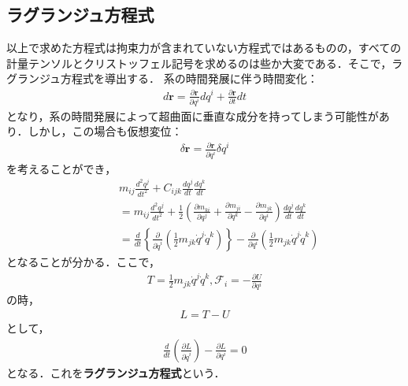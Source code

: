 \documentclass[../Main.tex]{subfiles}
\begin{document}
\subsection{ラグランジュ方程式}
以上で求めた方程式は拘束力が含まれていない方程式ではあるものの，すべての計量テンソルとクリストッフェル記号を求めるのは些か大変である．そこで，ラグランジュ方程式を導出する．
系の時間発展に伴う時間変化：
\begin{eqnarray}
  d\bm{r} = \frac{\partial \bm{r}}{\partial q^i}dq^i + \frac{\partial\bm{r}}{\partial t}dt
\end{eqnarray}
となり，系の時間発展によって超曲面に垂直な成分を持ってしまう可能性があり．しかし，この場合も仮想変位：
\begin{eqnarray}
  \delta\bm{r} = \frac{\partial \bm{r}}{\partial q^i}\delta q^i
\end{eqnarray}
を考えることができ，
\begin{eqnarray}
  &&m_{ij}\frac{d^2 q^j}{dt^2} + C_{ijk}\frac{d q^j}{dt}\frac{d q^k}{dt}\\
  \quad&&=m_{ij}\frac{d^2 q^j}{dt^2} + \frac{1}{2}\left( \frac{\partial m_{ki}}{\partial q^j}+\frac{\partial m_{ji}}{\partial q^k}-\frac{\partial m_{jk}}{\partial q^i} \right)\frac{d q^j}{dt}\frac{d q^k}{dt}\\
  \quad&&=\frac{d}{dt}\left\{ \frac{\partial}{\partial \dot{q}^i}\left( \frac{1}{2}m_{jk}\dot{q}^j\dot{q}^k \right) \right\} -\frac{\partial}{\partial q^i}\left( \frac{1}{2}m_{jk}\dot{q}^j\dot{q}^k  \right)
\end{eqnarray}
となることが分かる．ここで，
\begin{eqnarray}
  T = \frac{1}{2}m_{jk}\dot{q}^j\dot{q}^k, \mathcal{F}_i = -\frac{\partial U}{\partial q^i}
\end{eqnarray}
の時，
\begin{eqnarray}
  L = T-U
\end{eqnarray}
として，
\begin{eqnarray}
  \frac{d}{dt}\left( \frac{\partial L}{\partial \dot{q}^i} \right) - \frac{\partial L}{\partial q^i} =0
\end{eqnarray}
となる．これを\textbf{ラグランジュ方程式}という．
\end{document}

